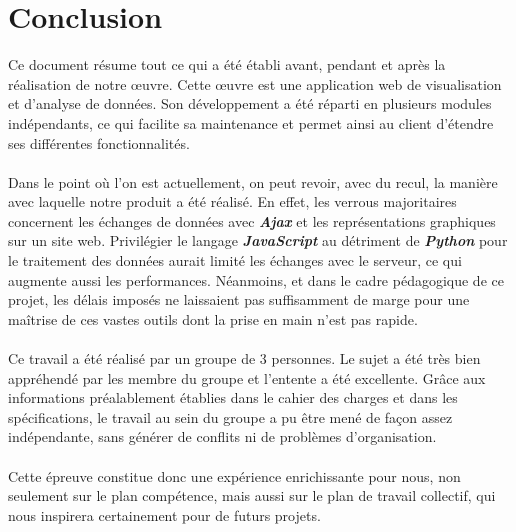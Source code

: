 	\section*{Conclusion}
	Ce document résume tout ce qui a été établi avant, pendant et après la réalisation de notre œuvre. Cette œuvre est une application web de visualisation et d'analyse de données. Son développement a été réparti en plusieurs modules indépendants, ce qui facilite sa maintenance et permet ainsi au client d'étendre ses différentes fonctionnalités.
	\paragraph{} Dans le point où l'on est actuellement, on peut revoir, avec du recul, la manière avec laquelle notre produit a été réalisé. En effet, les verrous majoritaires concernent les échanges de données avec \textit{\textbf{Ajax}} et les représentations graphiques sur un site web. Privilégier le langage \textit{\textbf{JavaScript}} au détriment de \textit{\textbf{Python}} pour le traitement des données aurait limité les échanges avec le serveur, ce qui augmente aussi les performances. Néanmoins, et dans le cadre pédagogique de ce projet, les délais imposés ne laissaient pas suffisamment de marge pour une maîtrise de ces vastes outils dont la prise en main n'est pas rapide.
	\paragraph{} Ce travail a été réalisé par un groupe de 3 personnes. Le sujet a été très bien appréhendé par les membre du groupe et l'entente a été excellente. Grâce aux informations préalablement établies dans le cahier des charges et dans les spécifications, le travail au sein du groupe a pu être mené de façon assez indépendante, sans générer de conflits ni de problèmes d'organisation.
	\paragraph{} Cette épreuve constitue donc une expérience enrichissante pour nous, non seulement sur le plan compétence, mais aussi sur le plan de travail collectif, qui nous inspirera certainement pour de futurs projets.
		

